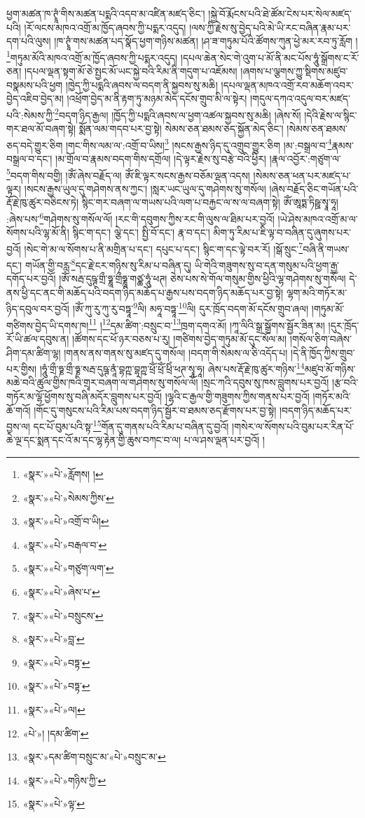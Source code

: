 ཕྱག་མཚན་ཁ་ཊྭཱཾ་གིས་མཚན་པདྨའི་འདབ་མ་འཛིན་མཛད་ཅིང་། །སྐྱེ་བོ་རྨོངས་པའི་ཐེ་ཚོམ་ངེས་པར་སེལ་མཛད་པའི། །རོ་ལངས་མཁའ་འགྲོ་མ་ཁྱོད་ཞབས་ཀྱི་པདྨར་འདུད། །ལས་ཀྱི་རྗེས་སུ་བྱེད་པའི་མེ་ཡི་རང་བཞིན་རྣམ་པར་དག་པའི་ལུས། །ཁ་ཊྭཱཾ་གས་མཚན་པད་སྣོད་ཕྱག་གཉིས་མཚན། །ཤ་ཟ་གཏུམ་པོའི་ཚོགས་ཀུན་ཕྱེ་མར་རབ་ཏུ་རློག །\footnote{«སྣར་»«པེ་»རློགས། །}གཏུམ་མོའི་མཁའ་འགྲོ་མ་ཁྱོད་ཞབས་ཀྱི་པདྨར་འདུད། །དཔལ་ཆེན་སེང་གེ་འུག་པ་མོ་ནི་མང་པོས་ཧཱུཾ་སྒྲོགས་ང་རོ་ཅན། །དཔལ་ལྡན་སྟག་མོ་ཅེ་སྤྱང་མོ་ཡང་སྐྱེ་བའི་རིམ་ནི་གདུག་པ་འཇོམས། །ཞགས་པ་ལྕགས་ཀྱུ་སྡིགས་མཛུབ་བསྣམས་པའི་ཕྱག །ཁྱེད་ཀྱི་པདྨའི་ཞབས་ལ་བདག་ནི་སྐྱབས་སུ་མཆི། །དཔལ་ལྡན་མཁའ་འགྲོ་རབ་མཆོག་འབར་བྱེད་འཇིབ་བྱེད་མ། །འཕྲོག་བྱེད་མ་ནི་རྟག་ཏུ་མཉམ་མེད་དངོས་གྲུབ་མི་ལ་སྟེར། །གདུལ་དཀའ་འདུལ་བར་མཛད་པའི་:སེམས་ཀྱི་\footnote{«སྣར་»«པེ་»སེམས་ཀྱིས་}བདག་ཉིད་རྒྱལ། །ཁྱོད་ཀྱི་པདྨའི་ཞབས་ལ་ཕྱག་འཚལ་སྐྱབས་སུ་མཆི། །ཞེས་སོ། །དེའི་རྗེས་ལ་སྙིང་གར་ཐལ་མོ་བཞག་སྟེ། སྨོན་ལམ་གདབ་པར་བྱ་སྟེ། སེམས་ཅན་ཐམས་ཅད་སྐྱོན་མེད་ཅིང་། །སེམས་ཅན་ཐམས་ཅད་བདེ་གྱུར་ཅིག །གང་གིས་ལམ་ལ་:འགྲོ་བ་ཡིས།\footnote{«སྣར་»«པེ་»འགྲོ་བ་ཡི།} །སངས་རྒྱས་ཉིད་དུ་འགྲུབ་གྱུར་ཅིག །མ་:བསྒྲལ་བ་\footnote{«སྣར་»«པེ་»བརྒལ་བ་}རྣམས་བསྒྲལ་བ་དང་། །མ་གྲོལ་བ་རྣམས་བདག་གིས་དགྲོལ། །དེ་ལྟར་རྗེས་སུ་བརྩེ་བའི་ཕྱིར། །རྣལ་འབྱོར་:གཙུག་ལ་\footnote{«སྣར་»«པེ་»གཙུག་ལག་}བདག་གིས་བགྱི། །ཨོཾ་ཞེས་བརྗོད་ལ། ཨོཾ་ཇི་ལྟར་སངས་རྒྱས་བཅོམ་ལྡན་འདས། །སེམས་ཅན་ཕན་པར་མཛད་པ་ལྟར། །སངས་རྒྱས་ཡུལ་དུ་གཤེགས་ནས་ཀྱང་། །སླར་ཡང་ཡུལ་དུ་གཤེགས་སུ་གསོལ། །ཞེས་བརྗོད་ཅིང་གཡོན་པའི་རྡོ་རྗེ་ཁུ་ཚུར་བཅིངས་ཏེ། སྙིང་གར་བཞག་ལ་གཡས་པའི་ལག་པ་བརྐྱང་ལ་ས་ལ་བཞག་སྟེ། ཨོཾ་ཨཱཏྨ་ཏིཥྛ་སྭཱ་ཧཱ། :ཞེས་པས་\footnote{«སྣར་»«པེ་»ཞེས་པ་}གཤེགས་སུ་གསོལ་ལོ། །རང་གི་དབུགས་ཀྱིས་རང་གི་ལུས་ལ་ཐིམ་པར་བྱའོ། །ཡེ་ཤེས་མཁའ་འགྲོ་མ་ལ་སོགས་པའི་ལྷ་མོ་ནི། སྙིང་ག་དང་། ལྕེ་དང་། སྤྱི་བོ་དང་། རྣ་བ་དང་། མིག་ཏུ་རིམ་པ་ཇི་ལྟ་བ་བཞིན་དུ་ཞུགས་པར་བྱའོ། །སེང་གེ་མ་ལ་སོགས་པ་ནི་མགྲིན་པ་དང་། དཔུང་པ་དང་། སྙིང་ག་དང་ལྟེ་བར་རོ། །སྒོ་སྲུང་\footnote{«སྣར་»«པེ་»བསྲུངས་}བཞི་ནི་གཡས་དང་། གཡོན་གྱི་བརླ་\footnote{«སྣར་»«པེ་»བླ་}དང་རྗེ་ངར་གཉིས་སུ་རིམ་པ་བཞིན་དུ། ཡི་གེའི་གཟུགས་སུ་བ་དན་གསུམ་པའི་ཕྱག་རྒྱ་དགོད་པར་བྱའོ། །ཨོཾ་སརྦ་དུཥྚ་གྲྀ་ཧྞཱ་གྲྀཧྞཱ་གཙྪ་ཧཱུཾ་ཕཊ། ཅེས་པས་སེ་གོལ་གསུམ་གྱིས་ཕྱིའི་ལྷ་གཤེགས་སུ་གསོལ། དེ་ནས་ཕྱི་དང་ནང་གི་མཆོད་པའི་བདག་ཉིད་མཆོད་པ་རྒྱས་པས་བདག་ཉིད་མཆོད་པར་བྱ་སྟེ། ལྷག་མའི་གཏོར་མ་ཉིད་དབུལ་བར་བྱའོ། །ཨོཾ་ཀུ་རུ་ཀུ་རུ་བཏྟཱ་\footnote{«སྣར་»«པེ་»བཏྟ་}ལི། མཧཱ་བཏྟཱ་\footnote{«སྣར་»«པེ་»བཏྟ་}ལི། དུར་ཁྲོད་བདག་མོ་དངོས་གྲུབ་ཞལ། །གཏུམ་མོ་གཙིགས་བྱེད་ཡི་དགས་ཁ།\footnote{«སྣར་»«པེ་»ལ།} །\footnote{«པེ་»། །དམ་ཚིག་}དམ་ཚིག་:བསྲུང་བ་\footnote{«སྣར་»དམ་ཚིག་བསྲུང་མ་«པེ་»བསྲུང་མ་}ཁྲག་དགའ་མོ། །ཀཱ་ལིའི་སྒྲ་སྒྲོགས་སྦྱོར་ཟིན་མ། །དུར་ཁྲོད་རོ་ཡི་ཚལ་དབུས་ན། །ཚོགས་དང་ཕོ་ཉར་བཅས་པ་རུ། །གཙིགས་བྱེད་གཏུམ་མོ་དུང་སོལ་མ། །གསོལ་ཅིག་བཞེས་ཤིག་དམ་ཚིག་ལྷ། །གནས་ནས་གནས་སུ་མཛད་དུ་གསོལ། །བདག་གི་སེམས་ལ་ཅི་འདོད་པ། །དེ་ནི་ཁྱོད་ཀྱིས་གྲུབ་པར་གྱིས། །ཧཱུཾ་གྲྀ་ཧྞ་གྲྀ་ཧྞ་སརྦ་དུཥྚ་ནཱཾ་བྷཀྵ་བྷཀྵ་ཕྲོཾ་ཕྲོཾ་ཕྲིཾ་ཕཊ་སྭཱ་ཧཱ། ཞེས་པས་རྡོ་རྗེ་ཁུ་ཚུར་གཉིས་\footnote{«སྣར་»«པེ་»གཉིས་ཀྱི་}མཛུབ་མོ་གཉིས་མཆེ་བའི་ཚུལ་གྱིས་ཁའི་གྲྭར་བཞག་ལ་གཤེགས་སུ་གསོལ་ལོ། །སྲང་ཀའི་དབུས་སུ་ཁས་བླུགས་པར་བྱའོ། །རྩ་བའི་གཏོར་མ་ལྷོ་ཕྱོགས་སུ་བཞི་མདོར་བླུགས་པར་བྱའོ། །ལྷའི་ང་རྒྱལ་གྱི་གཟུགས་ཀྱིས་གནས་པར་བྱའོ། །གཏོར་མའི་ཆོ་གའོ། །གོང་དུ་གསུངས་པའི་རིམ་པས་བདག་ཉིད་སྦྱོར་བ་ཐམས་ཅད་རྫོགས་པར་བྱ་སྟེ། །བདག་ཉིད་མཆོད་པར་བྱས་ལ། དང་པོ་བུམ་པའི་སྟ་\footnote{«སྣར་»«པེ་»ལྟ་}གོན་དུ་གནས་པའི་རིམ་པ་བཞིན་དུ་བྱའོ། །གསེར་ལ་སོགས་པའི་བུམ་པར་རིན་པོ་ཆེ་ལྔ་དང་སྨན་དང་འོ་མ་དང་ལྷ་རྟེན་གྱི་ཆུས་བཀང་བ་ལ། པ་ལ་ཤས་ལྡན་པར་བྱའོ། །
